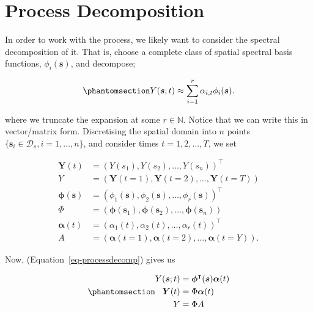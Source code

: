 \documentclass[
  letterpaper,
  DIV=11,
  numbers=noendperiod]{scrartcl}
\begin{document}
\section{Process Decomposition}\label{process-decomposition}

In order to work with the process, we likely want to consider the
spectral decomposition of it. That is, choose a complete class of
spatial spectral basis functions, \(\phi_i(\boldsymbol s)\), and
decompose;

\begin{equation}\phantomsection\label{eq-processdecomp}{
Y(\boldsymbol s;t) \approx \sum_{i=1}^{r} \alpha_{i,t} \phi_i(\boldsymbol s).\label{}
}\end{equation}

where we truncate the expansion at some \(r\in\mathbb N\). Notice that
we can write this in vector/matrix form. Discretising the spatial domain
into \(n\) points \(\{\boldsymbol s_i\in \mathcal D_s, i=1,\dots,n\}\),
and consider times \(t=1,2,\dots, T\), we set

\[
\begin{split}
\boldsymbol Y(t) &= (Y(s_1), Y(s_2),  \dots, Y(s_n))^{\intercal}\\
Y &= (\boldsymbol Y(t=1), \boldsymbol Y(t=2), \dots, \boldsymbol Y(t=T))\\
\boldsymbol \phi(\boldsymbol s) &= (\phi_1(\boldsymbol s), \phi_2(\boldsymbol s), \dots, \phi_r(\boldsymbol s))^{\intercal}\\
 \Phi &= (\boldsymbol \phi(\boldsymbol s_1), \boldsymbol \phi(\boldsymbol s_2), \dots, \boldsymbol \phi(\boldsymbol s_n))\\
\boldsymbol \alpha(t) &= (\alpha_1(t), \alpha_2(t), \dots, \alpha_r(t))^{\intercal}\\
 A &= (\boldsymbol \alpha(t=1), \boldsymbol \alpha(t=2), \dots, \boldsymbol \alpha(t=Y)).
\end{split}
\]

Now, (Equation~\ref{eq-processdecomp}) gives us

\begin{equation}\phantomsection\label{eq-pbvec}{
\begin{split}
Y(\boldsymbol s; t) &= \boldsymbol \phi^{\intercal}(\boldsymbol s) \boldsymbol \alpha(t)\\
\boldsymbol Y(t) &=  \Phi \boldsymbol \alpha(t)\\
 Y &=  \Phi  A
\end{split}
}\end{equation}
\end{document}

